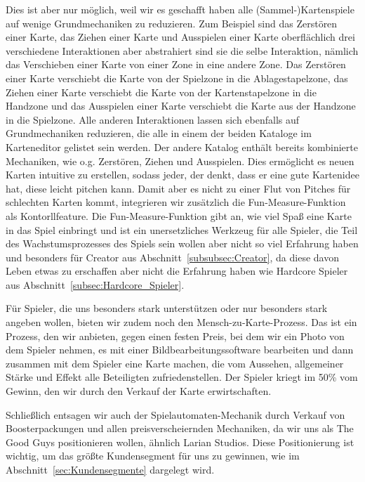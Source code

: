 \documentclass[fontsize=12, a4aper]{scrartcl}
\begin{document}
\noindent Dies ist aber nur möglich, weil wir es geschafft haben alle (Sammel-)Kartenspiele auf wenige Grundmechaniken zu reduzieren. Zum Beispiel sind das Zerstören einer Karte, das Ziehen einer Karte und Ausspielen einer Karte oberflächlich drei verschiedene Interaktionen aber abstrahiert sind sie die selbe Interaktion, nämlich das Verschieben einer Karte von einer Zone in eine andere Zone. Das Zerstören einer Karte verschiebt die Karte von der Spielzone in die Ablagestapelzone, das Ziehen einer Karte verschiebt die Karte von der Kartenstapelzone in die Handzone und das Ausspielen einer Karte verschiebt die Karte aus der Handzone in die Spielzone. Alle anderen Interaktionen lassen sich ebenfalls auf Grundmechaniken reduzieren, die alle in einem der beiden Kataloge im Karteneditor gelistet sein werden. Der andere Katalog enthält bereits kombinierte Mechaniken, wie o.g. Zerstören, Ziehen und Ausspielen. Dies ermöglicht es neuen Karten intuitive zu erstellen, sodass jeder, der denkt, dass er eine gute Kartenidee hat, diese leicht pitchen kann. Damit aber es nicht zu einer Flut von Pitches für schlechten Karten kommt, integrieren wir zusätzlich die \glqq Fun-Measure-Funktion\grqq{} als Kontorllfeature. Die \glqq Fun-Measure-Funktion\grqq{} gibt an, wie viel Spaß eine Karte in das Spiel einbringt und ist ein unersetzliches Werkzeug für alle Spieler, die Teil des Wachstumsprozesses des Spiels sein wollen aber nicht so viel Erfahrung haben und besonders für \glqq Creator\grqq{} aus Abschnitt~\ref{subsubsec:Creator}, da diese davon Leben etwas zu erschaffen aber nicht die Erfahrung haben wie \glqq Hardcore Spieler\grqq{} aus Abschnitt~\ref{subsec:Hardcore_Spieler}.\hfill\newline

\noindent Für Spieler, die uns besonders stark unterstützen oder nur besonders stark angeben wollen, bieten wir zudem noch den \glqq Mensch-zu-Karte-Prozess\grqq{}. Das ist ein Prozess, den wir anbieten, gegen einen festen Preis, bei dem wir ein Photo von dem Spieler nehmen, es mit einer Bildbearbeitungssoftware bearbeiten und dann zusammen mit dem Spieler eine Karte machen, die vom Aussehen, allgemeiner Stärke und Effekt alle Beteiligten zufriedenstellen. Der Spieler kriegt im 50\% vom Gewinn, den wir durch den Verkauf der Karte erwirtschaften.


\noindent Schließlich entsagen wir auch der Spielautomaten-Mechanik durch Verkauf von Boosterpackungen und allen preisverscheiernden Mechaniken, da wir uns als \glqq The Good Guys \grqq positionieren wollen, ähnlich Larian Studios. Diese Positionierung ist wichtig, um das größte Kundensegment für uns zu gewinnen, wie im Abschnitt~\ref{sec:Kundensegmente} dargelegt wird.\hfill\newline
\end{document}
